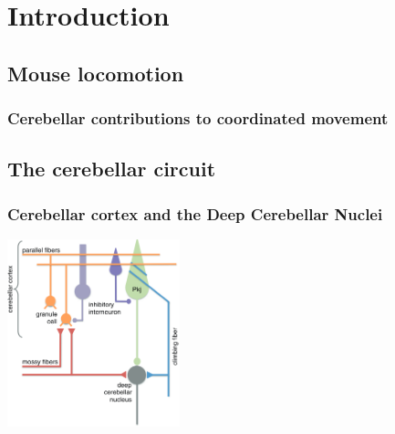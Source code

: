 
%

\chapter{Introduction}
\label{cha:introduction}


\epigraphfontsize{\small\itshape}
\setlength\epigraphwidth{12.5cm}
\setlength\epigraphrule{0pt}


\section{Mouse locomotion}
\label{sec:getting_started}

\subsection{Cerebellar contributions to coordinated movement}
\label{sub:using_overleaf}



\section{The cerebellar circuit}
\label{sec:cb_circuit}

\subsection{Cerebellar cortex and the Deep Cerebellar Nuclei}
\label{sub:cv_ctx_dcn}

\includegraphics[width=5cm]{Chapters/Figures/chapter1/placeholder_ch1_1_circuit.png}

